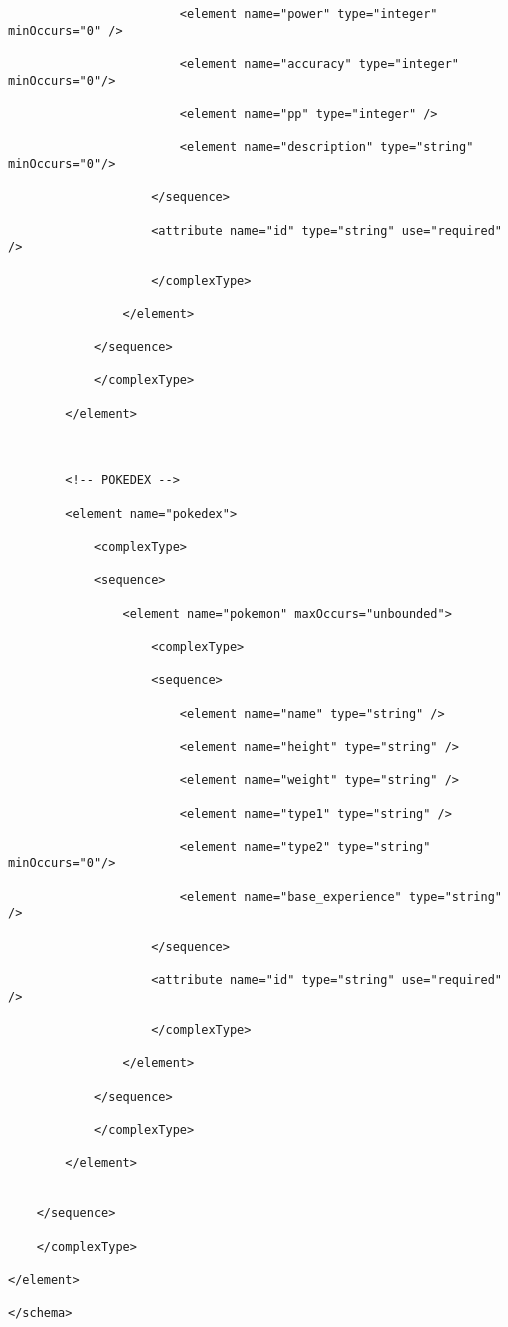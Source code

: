 \begin{lstlisting}
                        <element name="power" type="integer" minOccurs="0" />

                        <element name="accuracy" type="integer" minOccurs="0"/>

                        <element name="pp" type="integer" />

                        <element name="description" type="string" minOccurs="0"/>

                    </sequence>

                    <attribute name="id" type="string" use="required" />

                    </complexType>

                </element>

            </sequence>

            </complexType>

        </element>

        

        <!-- POKEDEX -->

        <element name="pokedex">

            <complexType>

            <sequence>

                <element name="pokemon" maxOccurs="unbounded">

                    <complexType>

                    <sequence>

                        <element name="name" type="string" />

                        <element name="height" type="string" />

                        <element name="weight" type="string" />

                        <element name="type1" type="string" />

                        <element name="type2" type="string" minOccurs="0"/>

                        <element name="base_experience" type="string" />

                    </sequence>

                    <attribute name="id" type="string" use="required" />

                    </complexType>

                </element>

            </sequence>

            </complexType>

        </element>


    </sequence>

    </complexType>

</element>

</schema>

\end{lstlisting}